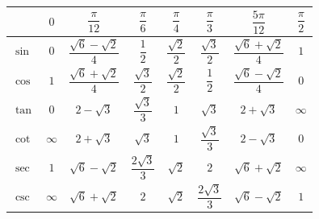 \documentclass[10pt, landscape, a4paper]{article}
\begin{document}
\begin{multicols}{3}
{
  \renewcommand{\arraystretch}{2.4}
  \renewcommand{\tabcolsep}{5pt}
  \begin{tabular}{l|ccccccc}
    &
    $0$ &
    $\dfrac{\pi}{12}$ &
    $\dfrac{\pi}{6}$ &
    $\dfrac{\pi}{4}$ &
    $\dfrac{\pi}{3}$ &
    $\dfrac{5\pi}{12}$ &
    $\dfrac{\pi}{2}$ \\
    \hline
    $\sin$ &
    $0$ &
    $\dfrac{\sqrt{6}-\sqrt{2}}{4}$ &
    $\dfrac{1}{2}$ &
    $\dfrac{\sqrt{2}}{2}$ &
    $\dfrac{\sqrt{3}}{2}$ &
    $\dfrac{\sqrt{6}+\sqrt{2}}{4}$ &
    $1$ \\
    \hline
    $\cos$ &
    $1$ &
    $\dfrac{\sqrt{6}+\sqrt{2}}{4}$ &
    $\dfrac{\sqrt{3}}{2}$ &
    $\dfrac{\sqrt{2}}{2}$ &
    $\dfrac{1}{2}$ &
    $\dfrac{\sqrt{6}-\sqrt{2}}{4}$ &
    $0$ \\
    \hline
    $\tan$ &
    $0$ &
    $2-\sqrt{3}$ &
    $\dfrac{\sqrt{3}}{3}$ &
    $1$ &
    $\sqrt{3}$ &
    $2+\sqrt{3}$ &
    $\infty$ \\
    \hline
    $\cot$ &
    $\infty$ &
    $2+\sqrt{3}$ &
    $\sqrt{3}$ &
    $1$ &
    $\dfrac{\sqrt{3}}{3}$ &
    $2-\sqrt{3}$ &
    $0$ \\
    \hline
    $\sec$ &
    $1$ &
    $\sqrt{6} - \sqrt{2}$ &
    $\dfrac{2\sqrt{3}}{3}$ &
    $\sqrt{2}$ &
    $2$ &
    $\sqrt{6}+\sqrt{2}$ &
    $\infty$ \\
    \hline
    $\csc$ &
    $\infty$ &
    $\sqrt{6}+\sqrt{2}$ &
    $2$ &
    $\sqrt{2}$ &
    $\dfrac{2\sqrt{3}}{3}$ &
    $\sqrt{6} - \sqrt{2}$ &
    $1$
  \end{tabular}
}


\end{multicols}
\end{document}

